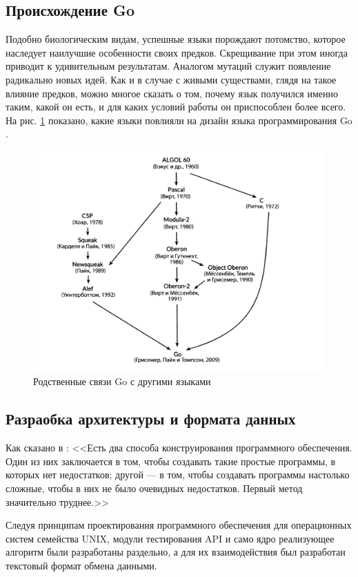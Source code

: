 \documentclass[14pt]{extarticle}
\begin{document}
	\subsection{Происхождение Go}
	Подобно биологическим видам, успешные языки порождают потомство, которое наследует наилучшие особенности своих предков. Скрещивание при этом иногда приводит к удивительным результатам. Аналогом мутаций служит появление радикально новых идей. Как и в случае с живыми существами, глядя на такое влияние предков, можно многое сказать о том, почему язык получился именно таким, какой он есть, и для каких условий работы он приспособлен более всего. На рис. \ref{goparents} показано, какие языки повлияли на дизайн языка программирования Go \cite{Golang}.
	\begin{figure}[h]
		\centering
		\includegraphics[scale=0.5]{goparents}
		\caption{Родственные связи Go с другими языками}
		\label{goparents}
	\end{figure}
	
	\subsection{Разраобка архитектуры и формата данных}
	Как сказано в \cite{Hoar}: <<Есть два способа конструирования программного обеспечения. Один из них заключается в том, чтобы создавать такие простые программы, в которых нет недостатков; другой --- в том, чтобы создавать программы настолько сложные, чтобы в них не было очевидных недостатков. Первый метод значительно труднее.>>
	
	Следуя принципам проектирования программного обеспечения для операционных систем семейства UNIX, модули тестирования API и само ядро реализующее алгоритм были разработаны раздельно, а для их взаимодействия был разработан текстовый формат обмена данными.
	
\end{document}

